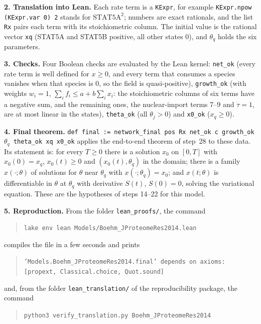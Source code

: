 \textbf{2. Translation into Lean.} Each rate term is a \texttt{KExpr}, for example \texttt{KExpr.npow (KExpr.var 0) 2} stands for $\mathrm{STAT5A}^2$; numbers are exact rationals, and the list \texttt{Rx} pairs each term with its stoichiometric column. The initial value is the rational vector \texttt{xq} (STAT5A and STAT5B positive, all other states 0), and \texttt{$\theta_q$} holds the six parameters.

\textbf{3. Checks.} Four Boolean checks are evaluated by the Lean kernel: \texttt{net\_ok} (every rate term is well defined for $x\ge0$, and every term that consumes a species vanishes when that species is 0, so the field is quasi-positive), \texttt{growth\_ok} (with weights $w_i=1$, $\sum_if_i\le a+b\sum_ix_i$: the stoichiometric columns of six terms have a negative sum, and the remaining ones, the nuclear-import terms 7--9 and $\dot\tau=1$, are at most linear in the states), \texttt{theta\_ok} (all $\theta_j>0$) and \texttt{x0\_ok} ($x_q\ge0$).

\textbf{4. Final theorem.} \texttt{def final := network\_final pos Rx net\_ok c growth\_ok $\theta_q$ theta\_ok xq x0\_ok} applies the end-to-end theorem of step~28 to these data. Its statement is: for every $T\ge0$ there is a solution $x_0$ on $[0,T]$ with $x_0(0)=x_q$, $x_0(t)\ge0$ and $(x_0(t),\theta_q)$ in the domain; there is a family $x(\cdot;\theta)$ of solutions for $\theta$ near $\theta_q$ with $x(\cdot;\theta_q)=x_0$; and $x(t;\theta)$ is differentiable in $\theta$ at $\theta_q$ with derivative $S(t)$, $S(0)=0$, solving the variational equation. These are the hypotheses of steps 14--22 for this model.

\textbf{5. Reproduction.} From the folder \texttt{lean\_proofs/}, the command

\begin{quote}\small\raggedright\texttt{lake env lean Models/Boehm\_JProteomeRes2014.lean}\end{quote}

compiles the file in a few seconds and prints

\begin{quote}\small\raggedright\texttt{'Models.Boehm\_JProteomeRes2014.final' depends on axioms: [propext, Classical.choice, Quot.sound]}\end{quote}

and, from the folder \texttt{lean\_translation/} of the reproducibility package, the command

\begin{quote}\small\raggedright\texttt{python3 verify\_translation.py Boehm\_JProteomeRes2014}\end{quote}

